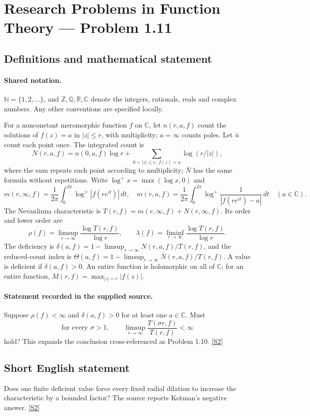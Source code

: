 \documentclass[11pt]{article}
\newcommand{\sref}[2]{\hyperlink{source:#1:#2}{[S#2]}}
\begin{document}
\section{Research Problems in Function Theory — Problem 1.11}\label{statement}

\subsection{Definitions and mathematical statement}

\paragraph{Shared notation.}$\mathbb N=\{1,2,\ldots\}$, and $\mathbb Z,\mathbb Q,\mathbb R,\mathbb C$ denote the integers, rationals, reals and complex numbers. Any other conventions are specified locally.


For a nonconstant meromorphic function $f$ on $\mathbb C$, let $n(r,a,f)$ count the solutions of $f(z)=a$ in $|z|\le r$, with multiplicity; $a=\infty$ counts poles. Let $\bar n$ count each point once. The integrated count is
\[
 N(r,a,f)=n(0,a,f)\log r+\sum_{0<|z|\le r,\ f(z)=a}\log(r/|z|),
\]
where the sum repeats each point according to multiplicity; $\bar N$ has the same formula without repetitions. Write $\log^+x=\max(\log x,0)$ and
\[
 m(r,\infty,f)=\frac1{2\pi}\int_0^{2\pi}\log^+|f(re^{it})|\,dt,\quad
 m(r,a,f)=\frac1{2\pi}\int_0^{2\pi}\log^+\frac1{|f(re^{it})-a|}\,dt\quad(a\in\mathbb C).
\]
The Nevanlinna characteristic is $T(r,f)=m(r,\infty,f)+N(r,\infty,f)$. Its order and lower order are
\[
 \rho(f)=\limsup_{r\to\infty}\frac{\log T(r,f)}{\log r},\qquad
 \lambda(f)=\liminf_{r\to\infty}\frac{\log T(r,f)}{\log r}.
\]
The deficiency is $\delta(a,f)=1-\limsup_{r\to\infty}N(r,a,f)/T(r,f)$, and the reduced-count index is $\Theta(a,f)=1-\limsup_{r\to\infty}\bar N(r,a,f)/T(r,f)$. A value is deficient if $\delta(a,f)>0$. An entire function is holomorphic on all of $\mathbb C$; for an entire function, $M(r,f)=\max_{|z|=r}|f(z)|$.
\paragraph{Statement recorded in the supplied source.}
Suppose $\rho(f)<\infty$ and $\delta(a,f)>0$ for at least one $a\in\mathbb C$. Must
\[
 \text{for every }\sigma>1,\qquad
 \limsup_{r\to\infty}\frac{T(\sigma r,f)}{T(r,f)}<\infty
\]
hold? This expands the conclusion cross-referenced as Problem 1.10. \sref{statement}{2}
\subsection{Short English statement}
Does one finite deficient value force every fixed radial dilation to increase the characteristic by a bounded factor? The source reports Kotman’s negative answer. \sref{statement}{2}
\end{document}
